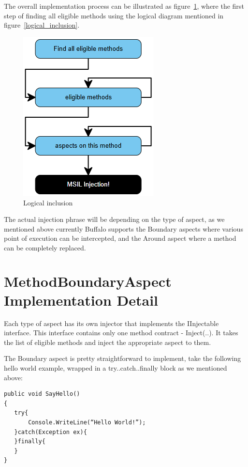 The overall implementation process can be illustrated as figure~\ref{implementation_overview}, where the first step of finding all eligible methods using the logical diagram mentioned in figure~\ref{logical_inclusion}.

\begin{figure}[here]
  \includegraphics[scale=1.0]{ImplementationOverview3.PNG}
  \centering
  \caption{Logical inclusion\label{implementation_overview}}
\end{figure}

The actual injection phrase will be depending on the type of aspect, as we mentioned above currently Buffalo supports the Boundary aspects where various point of execution can be intercepted, and the Around aspect where a method can be completely replaced.

\section{MethodBoundaryAspect Implementation Detail}

Each type of aspect has its own injector that implements the IInjectable interface. This interface contains only one method contract - Inject(..). It takes the list of eligible methods and inject the appropriate aspect to them.

The Boundary aspect is pretty straightforward to implement, take the following hello world example, wrapped in a try..catch..finally block as we mentioned above:

\begin{lstlisting}[caption={SayHello function}, label=sayhello]
public void SayHello()
{
   try{
       Console.WriteLine(“Hello World!”);
   }catch(Exception ex){
   }finally{
   }
}
\end{lstlisting}

